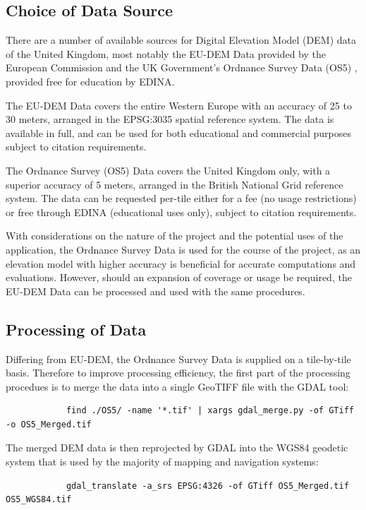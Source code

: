 \documentclass[11pt, oneside]{article}
\begin{document}
	\subsection{Choice of Data Source}
		There are a number of available sources for Digital Elevation Model (DEM) data of the United Kingdom, most notably the EU-DEM Data \cite{eu-dem} provided by the European Commission and the UK Government's Ordnance Survey Data (OS5) \cite{os-5}, provided free for education by EDINA. 
		
		The EU-DEM Data covers the entire Western Europe with an accuracy of 25 to 30 meters, arranged in the EPSG:3035 \cite{epsg-3035} spatial reference system. The data is available in full, and can be used for both educational and commercial purposes subject to citation requirements. 
		
		The Ordnance Survey (OS5) Data covers the United Kingdom only, with a superior accuracy of 5 meters, arranged in the British National Grid \cite{osgb-1936} reference system. The data can be requested per-tile either for a fee (no usage restrictions) or free through EDINA (educational uses only), subject to citation requirements.
		
		With considerations on the nature of the project and the potential uses of the application, the Ordnance Survey Data is used for the course of the project, as an elevation model with higher accuracy is beneficial for accurate computations and evaluations. However, should an expansion of coverage or usage be required, the EU-DEM Data can be processed and used with the same procedures.
		
	\subsection{Processing of Data} 
		Differing from EU-DEM, the Ordnance Survey Data is supplied on a tile-by-tile basis. Therefore to improve processing efficiency, the first part of the processing procedues is to merge the data into a single GeoTIFF \cite{geotiff} file with the GDAL tool:
		\begin{verbatim}
			find ./OS5/ -name '*.tif' | xargs gdal_merge.py -of GTiff -o OS5_Merged.tif 
		\end{verbatim}
		
		The merged DEM data is then reprojected by GDAL into the WGS84 geodetic system \cite{wgs84} that is used by the majority of mapping and navigation systems:
		\begin{verbatim}
			gdal_translate -a_srs EPSG:4326 -of GTiff OS5_Merged.tif OS5_WGS84.tif
		\end{verbatim}
		
\end{document}
